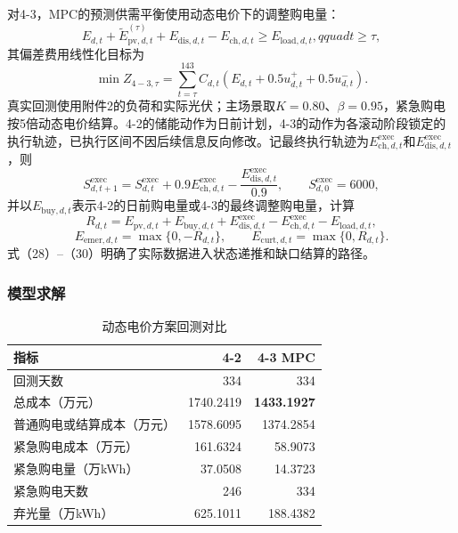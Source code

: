 \documentclass{cumcmthesis}
\begin{document}
对4-3，MPC的预测供需平衡使用动态电价下的调整购电量：
\begin{equation}
E_{d,t}+\widetilde E_{\mathrm{pv},d,t}^{(\tau)}+E_{\mathrm{dis},d,t}-E_{\mathrm{ch},d,t}
\geq E_{\mathrm{load},d,t},qquad t\geq\tau,
\tag{26}
\end{equation}
其偏差费用线性化目标为
\begin{equation}
\min Z_{4-3,\tau}=\sum_{t=\tau}^{143}C_{d,t}
\left(E_{d,t}+0.5u^+_{d,t}+0.5u^-_{d,t}\right).
\tag{27}
\end{equation}
真实回测使用附件2的负荷和实际光伏；主场景取$K=0.80$、$\beta=0.95$，紧急购电按5倍动态电价结算。4-2的储能动作为日前计划，4-3的动作为各滚动阶段锁定的执行轨迹，已执行区间不因后续信息反向修改。记最终执行轨迹为$E_{\mathrm{ch},d,t}^{\mathrm{exec}}$和$E_{\mathrm{dis},d,t}^{\mathrm{exec}}$，则
\begin{equation}
S_{d,t+1}^{\mathrm{exec}}=S_{d,t}^{\mathrm{exec}}+0.9E_{\mathrm{ch},d,t}^{\mathrm{exec}}
-\frac{E_{\mathrm{dis},d,t}^{\mathrm{exec}}}{0.9},\qquad S_{d,0}^{\mathrm{exec}}=6000,
\tag{28}
\end{equation}
并以$E_{\mathrm{buy},d,t}$表示4-2的日前购电量或4-3的最终调整购电量，计算
\begin{equation}
R_{d,t}=E_{\mathrm{pv},d,t}+E_{\mathrm{buy},d,t}+E_{\mathrm{dis},d,t}^{\mathrm{exec}}
-E_{\mathrm{ch},d,t}^{\mathrm{exec}}-E_{\mathrm{load},d,t},
\tag{29}
\end{equation}
\begin{equation}
E_{\mathrm{emer},d,t}=\max\{0,-R_{d,t}\},\qquad
E_{\mathrm{curt},d,t}=\max\{0,R_{d,t}\}.
\tag{30}
\end{equation}
式（28）--（30）明确了实际数据进入状态递推和缺口结算的路径。

\subsubsection{模型求解}

\begin{table}[H]
\centering
\renewcommand\arraystretch{1.2}
\caption{动态电价方案回测对比}
\label{tab:q4main}
\begin{tabular}{lrr}
\toprule
\textbf{指标} & \textbf{4-2} & \textbf{4-3 MPC}\\
\midrule
回测天数 & 334 & 334\\
总成本（万元） & 1740.2419 & \textbf{1433.1927}\\
普通购电或结算成本（万元） & 1578.6095 & 1374.2854\\
紧急购电成本（万元） & 161.6324 & 58.9073\\
紧急购电量（万kWh） & 37.0508 & 14.3723\\
紧急购电天数 & 246 & 334\\
弃光量（万kWh） & 625.1011 & 188.4382\\
\bottomrule
\end{tabular}
\end{table}
\end{document}
